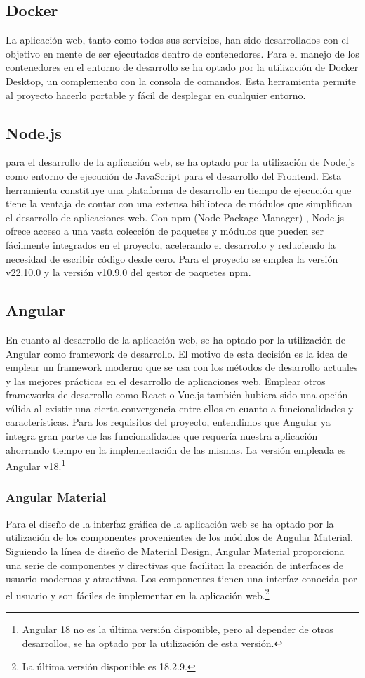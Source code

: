 \documentclass[12pt, a4paper, twoside]{article}
\begin{document}
\subsection{Docker}
La aplicación web, tanto como todos sus servicios, han sido desarrollados con el objetivo en mente de ser ejecutados dentro de contenedores.
Para el manejo de los contenedores en el entorno de desarrollo se ha optado por la utilización de Docker Desktop, un complemento con la consola de comandos.
Esta herramienta permite al proyecto hacerlo portable y fácil de desplegar en cualquier entorno.
\subsection{Node.js}
\cite{nodejs}
para el desarrollo de la aplicación web, se ha optado por la utilización de Node.js como entorno de ejecución de JavaScript para el desarrollo del Frontend.
Esta herramienta constituye una plataforma de desarrollo en tiempo de ejecución que tiene la ventaja de contar con una extensa biblioteca de módulos que simplifican el desarrollo de aplicaciones web.
Con npm (Node Package Manager) \cite{npm}, Node.js ofrece acceso a una vasta colección de paquetes y módulos que pueden ser fácilmente integrados en el proyecto, acelerando el desarrollo y reduciendo la necesidad de escribir código desde cero.
Para el proyecto se emplea la versión v22.10.0 y la versión v10.9.0 del gestor de paquetes npm.
\subsection{Angular}
\cite{angular}
En cuanto al desarrollo de la aplicación web, se ha optado por la utilización de Angular como framework de desarrollo.
El motivo de esta decisión es la idea de emplear un framework moderno que se usa con los métodos de desarrollo actuales y las mejores prácticas en el desarrollo de aplicaciones web.
Emplear otros frameworks de desarrollo como React o Vue.js también hubiera sido una opción válida al existir una cierta convergencia entre ellos en cuanto a funcionalidades y características.
Para los requisitos del proyecto, entendimos que Angular ya integra gran parte de las funcionalidades que requería nuestra aplicación ahorrando tiempo en la implementación de las mismas. La versión empleada es Angular v18.\footnote{Angular 18 no es la última versión disponible, pero al depender de otros desarrollos, se ha optado por la utilización de esta versión.}
\subsubsection{Angular Material}
\cite{angular_material}
Para el diseño de la interfaz gráfica de la aplicación web se ha optado por la utilización de los componentes provenientes de los módulos de Angular Material.
Siguiendo la línea de diseño de Material Design, Angular Material proporciona una serie de componentes y directivas que facilitan la creación de interfaces de usuario modernas y atractivas.
Los componentes tienen una interfaz conocida por el usuario y son fáciles de implementar en la aplicación web.\footnote{La última versión disponible es 18.2.9.}
\end{document}
